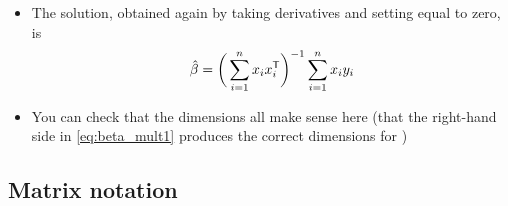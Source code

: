 \documentclass{article}
\begin{document}
\begin{itemize}
\item The solution, obtained again by taking derivatives and setting equal to
  zero, is
  \begin{equation}
  \label{eq:beta_mult1}
  \hat{\beta} = \bigg( \sum_{i=1}^n x_i x_i^{\mathsf{T}} \bigg)^{-1} \sum_{i=1}^n x_i y_i  
  \end{equation}

\item You can check that the dimensions all make sense here (that the right-hand
  side in \eqref{eq:beta_mult1} produces the correct dimensions for
  \smash{$\hbeta$}) 
\end{itemize}

\subsection{Matrix notation}
\end{document}
